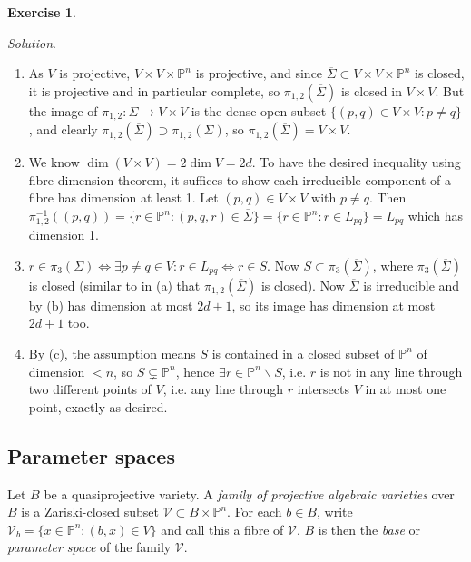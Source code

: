 \documentclass{article}
\newcommand{\p}{\mathbb{P}}
\newcommand{\V}{\mathcal{V}}
\theoremstyle{definition}
\newtheorem{exe}[defn]{Exercise}
\begin{document}
\begin{exe}
\begin{enumerate}
\textit{Solution}. \begin{enumerate}
\item As $V$ is projective, $V\times V\times\p^n$ is projective, and since $\overline\Sigma\subset V\times V\times\p^n$ is closed, it is projective and in particular complete, so $\pi_{1,2}(\overline\Sigma)$ is closed in $V\times V$. But the image of $\pi_{1,2}:\Sigma\rightarrow V\times V$ is the dense open subset $\{(p,q)\in V\times V:p\neq q\}$, and clearly $\pi_{1,2}(\overline\Sigma)\supset\pi_{1,2}(\Sigma)$, so $\pi_{1,2}(\overline\Sigma)=V\times V$.
\item We know $\dim(V\times V)=2\dim V=2d$. To have the desired inequality using fibre dimension theorem, it suffices to show each irreducible component of a fibre has dimension at least 1. Let $(p,q)\in V\times V$ with $p\neq q$. Then $\pi_{1,2}^{-1}((p,q))=\{r\in\p^n:(p,q,r)\in\overline{\Sigma}\}=\{r\in\p^n:r\in L_{pq}\}=L_{pq}$ which has dimension 1.
\item $r\in\pi_3(\Sigma)\iff\exists p\neq q\in V:r\in L_{pq}\iff r\in S$. Now $S\subset\pi_3(\overline\Sigma)$, where $\pi_3(\overline\Sigma)$ is closed (similar to in (a) that $\pi_{1,2}(\overline\Sigma)$ is closed). Now $\overline{\Sigma}$ is irreducible and by (b) has dimension at most $2d+1$, so its image has dimension at most $2d+1$ too.
\item By (c), the assumption means $S$ is contained in a closed subset of $\p^n$ of dimension $<n$, so $S\subsetneq\p^n$, hence $\exists r\in\p^n\backslash S$, i.e. $r$ is not in any line through two different points of $V$, i.e. any line through $r$ intersects $V$ in at most one point, exactly as desired.
\end{enumerate}
\end{enumerate}
\end{exe}

\subsection{Parameter spaces}
Let $B$ be a quasiprojective variety. A \textit{family of projective algebraic varieties} over $B$ is a Zariski-closed subset $\V\subset B\times\p^n$. For each $b\in B$, write $\V_b=\{x\in\p^n:(b,x)\in V\}$ and call this a fibre of $\V$. $B$ is then the \textit{base} or \textit{parameter space} of the family $\V$.
\end{document}

